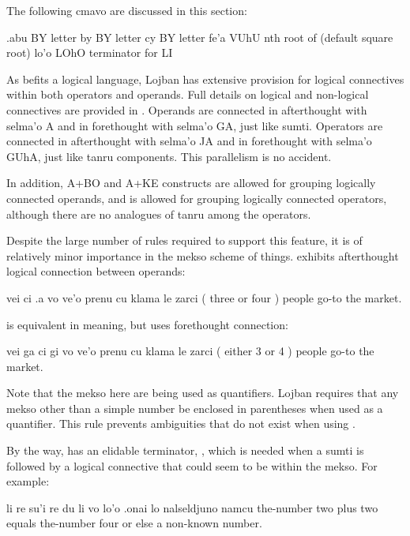The following cmavo are discussed in this section:

   .abu    BY  letter 
    by  BY  letter 
    cy  BY  letter 
    fe'a    VUhU    nth root of (default square root)
    lo'o    LOhO    terminator for LI

As befits a logical language, Lojban has extensive provision
    for logical connectives within both operators and operands.
    Full details on logical and non-logical connectives are
    provided in . Operands are
    connected in afterthought with selma'o A and in forethought
    with selma'o GA, just like sumti. Operators are connected in
    afterthought with selma'o JA and in forethought with selma'o
    GUhA, just like tanru components. This parallelism is no
    accident. 

In addition, A+BO and A+KE constructs are allowed for
    grouping logically connected operands, and  is
    allowed for grouping logically connected operators, although
    there are no analogues of tanru among the operators.

Despite the large number of rules required to support this
    feature, it is of relatively minor importance in the mekso
    scheme of things.  exhibits
    afterthought logical connection between operands:
\begin{example}
vei ci .a vo ve'o prenu cu klama le zarci\n
( three or four ) people go-to the market.
\end{example}

 is equivalent in meaning, but
    uses forethought connection:
\begin{example}
vei ga ci gi vo ve'o prenu cu klama le zarci\n
( either 3 or 4 ) people go-to the market.
\end{example}

Note that the mekso here are being used as quantifiers. Lojban
    requires that any mekso other than a simple number be enclosed
    in parentheses when used as a quantifier. This rule prevents
    ambiguities that do not exist when using . 

By the way,  has an elidable terminator, ,
    which is needed when a  sumti is followed by a logical
    connective that could seem to be within the mekso. For
    example:
\begin{example}
li re su'i re du\n
\T	li vo lo'o .onai lo nalseldjuno namcu\n
the-number two plus two equals\n
\T	the-number four or else a non-known number.
\end{example}

